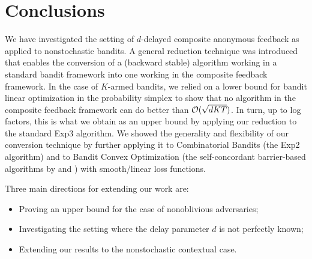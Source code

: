 
\section{Conclusions}
%
We have investigated the setting of $d$-delayed composite anonymous feedback as applied to nonstochastic bandits.
A general reduction technique was introduced that enables the conversion of a (backward stable) algorithm working in a standard bandit framework into one working in the composite feedback framework. In the case of $K$-armed bandits, we relied on a lower bound for bandit linear optimization in the probability simplex to show that no algorithm in the composite feedback framework can do better than $\mathcal{O}(\sqrt{dKT})$. In turn, up to log factors, this is what we obtain as an upper bound by applying our reduction to the standard Exp3 algorithm. We showed the generality and flexibility of our conversion technique by further applying it to Combinatorial Bandits (the Exp2 algorithm) and to Bandit Convex Optimization (the self-concordant barrier-based algorithms by \cite{ahr12} and \cite{st11}) with smooth/linear loss functions.

Three main directions for extending our work are:
\begin{itemize} 
\item Proving an upper bound for the case of nonoblivious adversaries;
\item Investigating the setting where the delay parameter $d$ is not perfectly known;
\item Extending our results to the nonstochastic contextual case.
\end{itemize}

\iffalse
 ****** CG: still working on it *****

In the latter case, the resulting Bandit Convex Optimization algorithm for composite anonymous feedback turned out to achieve regret bounds with higher rates than those of the corresponding base bandit algorithms, and we suspect that there is margin for improvement in our stability analysis of Lemma \ref{l:stabilityconvexscrible}.

Say something about possible directions
\fi
